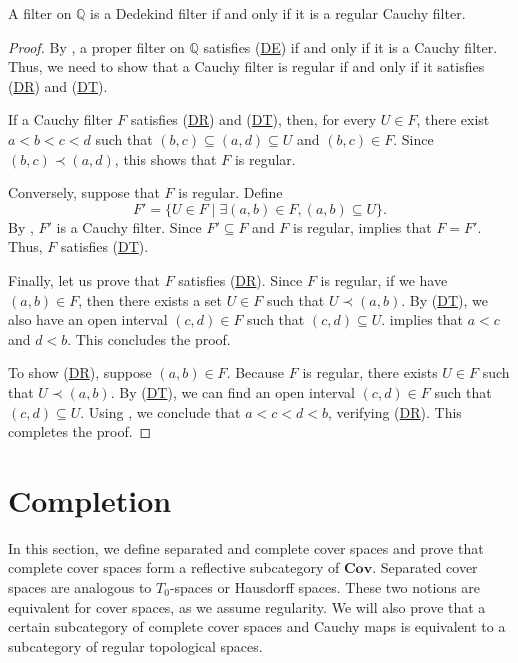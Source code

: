 \documentclass[reqno]{amsart}
\newcommand{\axref}[1]{(\hyperref[ax:#1]{#1})}
\theoremstyle{definition}
\theoremstyle{remark}
\numberwithin{figure}{section}
\newcommand{\rb}{\prec}
\newcommand{\cat}[1]{\mathbf{#1}}
\begin{document}
\begin{prop}
A filter on $\mathbb{Q}$ is a Dedekind filter if and only if it is a regular Cauchy filter.
\end{prop}
\begin{proof}
By , a proper filter on $\mathbb{Q}$ satisfies \axref{DE} if and only if it is a Cauchy filter.
Thus, we need to show that a Cauchy filter is regular if and only if it satisfies \axref{DR} and \axref{DT}.

If a Cauchy filter $F$ satisfies \axref{DR} and \axref{DT}, then, for every $U \in F$, there exist $a < b < c < d$ such that $(b,c) \subseteq (a,d) \subseteq U$ and $(b,c) \in F$.
Since $(b,c) \rb (a,d)$, this shows that $F$ is regular.

Conversely, suppose that $F$ is regular.
Define
\[ F' = \{ U \in F \mid \exists (a,b) \in F, (a,b) \subseteq U \}. \]
By , $F'$ is a Cauchy filter.
Since $F' \subseteq F$ and $F$ is regular,  implies that $F = F'$.
Thus, $F$ satisfies \axref{DT}.

Finally, let us prove that $F$ satisfies \axref{DR}.
Since $F$ is regular, if we have $(a,b) \in F$, then there exists a set $U \in F$ such that $U \rb (a,b)$.
By \axref{DT}, we also have an open interval $(c,d) \in F$ such that $(c,d) \subseteq U$.
 implies that $a < c$ and $d < b$.
This concludes the proof.

To show \axref{DR}, suppose $(a,b) \in F$.
Because $F$ is regular, there exists $U \in F$ such that $U \rb (a,b)$.
By \axref{DT}, we can find an open interval $(c,d) \in F$ such that $(c,d) \subseteq U$.
Using , we conclude that $a < c < d < b$, verifying \axref{DR}.
This completes the proof.
\end{proof}

\section{Completion}
\label{sec:completion}

In this section, we define separated and complete cover spaces and prove that complete cover spaces form a reflective subcategory of $\cat{Cov}$.
Separated cover spaces are analogous to $T_0$-spaces or Hausdorff spaces.
These two notions are equivalent for cover spaces, as we assume regularity.
We will also prove that a certain subcategory of complete cover spaces and Cauchy maps is equivalent to a subcategory of regular topological spaces.
\end{document}

